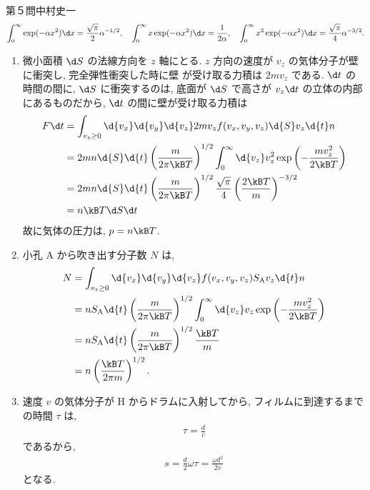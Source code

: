 \begin{answer}{第５問}{中村史一}
\begin{align}
  \int_0^\infty \exp(-\alpha x^2)\d x = \frac{\sqrt{\pi}}2 \alpha^{-1/2},\quad
  \int_0^\infty x \exp(-\alpha x^2)\d x = \frac1{2\alpha},\quad
  \int_0^\infty x^2 \exp(-\alpha x^2)\d x = \frac{\sqrt{\pi}}4 \alpha^{-3/2}.
\end{align}
\begin{enumerate}
\item
  微小面積 $\d S$ の法線方向を $z$ 軸にとる. $z$ 方向の速度が $v_z$ の気体分子が壁に衝突し, 完全弾性衝突した時に壁
  が受け取る力積は $2mv_z$ である. $\d t$ の時間の間に, $\d S$ に衝突するのは, 底面が $\d S$ で高さが $v_z\d t$ の立体の内部
  にあるものだから, $\d t$ の間に壁が受け取る力積は
  \begin{align}
    F \d t
    &= \int_{v_z\ge0} \d{v_x}\d{v_y}\d{v_z} 2mv_z f(v_x,v_y,v_z)\d{S}v_z\d{t}n \nonumber\\
    &= 2 m n \d{S}\d{t} \left(\frac{m}{2\pi\kB T}\right)^{1/2} \int_0^\infty \d{v_z} v_z^2 \exp\left(-\frac{mv_z^2}{2\kB T}\right) \nonumber\\
    &= 2 m n \d{S}\d{t} \left(\frac{m}{2\pi\kB T}\right)^{1/2} \frac{\sqrt{\pi}}4 \left(\frac{2\kB T}m\right)^{-3/2} \nonumber\\
    &= n\kB T \d S \d t
  \end{align}
  故に気体の圧力は, $p = n\kB T$.
\item
  小孔 A から吹き出す分子数 $N$ は,
  \begin{align}
    N &= \int_{v_z\ge0} \d{v_x}\d{v_y}\d{v_z} f(v_x,v_y,v_z) S_\mathrm{A} v_z\d{t} n \nonumber\\
    &= nS_\mathrm{A}\d{t}\left(\frac{m}{2\pi\kB T}\right)^{1/2} \int_0^\infty \d{v_z} v_z \exp\left(-\frac{mv_z^2}{2\kB T}\right) \nonumber\\
    &= nS_\mathrm{A}\d{t}\left(\frac{m}{2\pi\kB T}\right)^{1/2} \frac{\kB T}m \nonumber\\
    &= n \left(\frac{\kB T}{2\pi m}\right)^{1/2}.
  \end{align}
\item
  速度 $v$ の気体分子が H からドラムに入射してから, フィルムに到達するまでの時間 $\tau$ は,
  \begin{align}
    \tau = \frac{d}v
  \end{align}
  であるから,
  \begin{align}
    s=\frac{d}2\omega \tau = \frac{\omega d^2}{2v}
  \end{align}
  となる.

\end{enumerate}
\end{answer}
